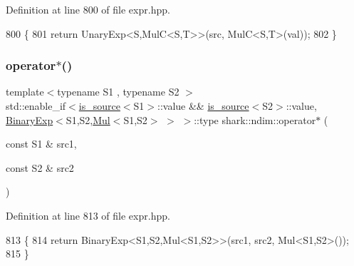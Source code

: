 Definition at line 800 of file expr.\+hpp.


\begin{DoxyCode}
800                                                                                                            
                                   \{
801             \textcolor{keywordflow}{return} UnaryExp<S,MulC<S,T>>(src, MulC<S,T>(val));
802         \}
\end{DoxyCode}
\hypertarget{namespaceshark_1_1ndim_aa4481e240ad9a193e7502a3d5bf9caf3}{}\label{namespaceshark_1_1ndim_aa4481e240ad9a193e7502a3d5bf9caf3} 
\subsubsection{\texorpdfstring{operator$\ast$()}{operator*()}\hspace{0.1cm}{\footnotesize\ttfamily [6/6]}}
{\footnotesize\ttfamily template$<$typename S1 , typename S2 $>$ \\
std\+::enable\+\_\+if$<$\hyperlink{classshark_1_1ndim_1_1is__source}{is\+\_\+source}$<$S1$>$\+::value \&\& \hyperlink{classshark_1_1ndim_1_1is__source}{is\+\_\+source}$<$S2$>$\+::value, \hyperlink{classshark_1_1ndim_1_1_binary_exp}{Binary\+Exp}$<$S1,S2,\hyperlink{classshark_1_1ndim_1_1_mul}{Mul}$<$S1,S2$>$ $>$ $>$\+::type shark\+::ndim\+::operator$\ast$ (\begin{DoxyParamCaption}\item[{const S1 \&}]{src1,  }\item[{const S2 \&}]{src2 }\end{DoxyParamCaption})}



Definition at line 813 of file expr.\+hpp.


\begin{DoxyCode}
813                                                                                                            
                                              \{
814             \textcolor{keywordflow}{return} BinaryExp<S1,S2,Mul<S1,S2>>(src1, src2, Mul<S1,S2>());
815         \}
\end{DoxyCode}
\hypertarget{namespaceshark_1_1ndim_a539041908107c07ec2a9cd6eb9cdc11d}{}\label{namespaceshark_1_1ndim_a539041908107c07ec2a9cd6eb9cdc11d} 
